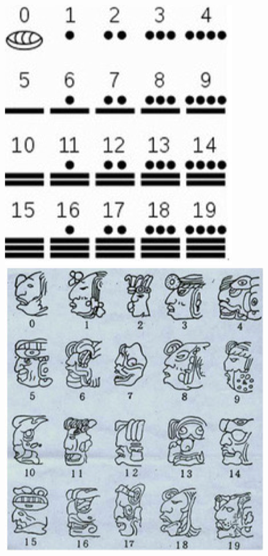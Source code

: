 \begin{figure}[ht]
  \centering
  \begin{minipage}[t]{0.4\textwidth}
    \includegraphics[width=\textwidth]{asset/265551e1-4fa0-4611-b795-3835b8967cf0.png}
    \caption{}
    \label{fig:img2_9}
  \end{minipage}%
  \hspace{1em}
  \begin{minipage}[t]{0.4\textwidth}
    \includegraphics[width=\textwidth]{asset/71bac7f0-1042-47b2-a771-34b5eb04b656.png}

\end{minipage}
\end{figure}
